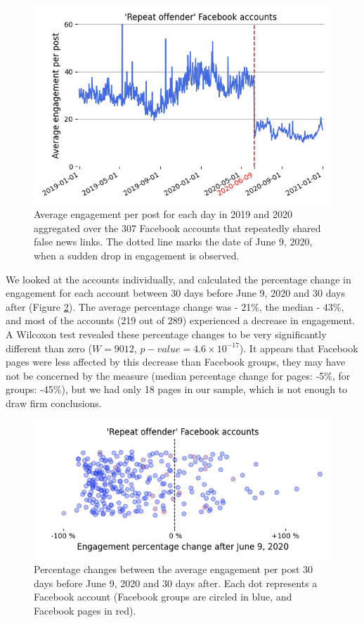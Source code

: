 \documentclass[11pt,a4paper]{article}
\begin{document}
\begin{figure}[!h]
\centering
\includegraphics[width=\linewidth]{./../figure/repeat_average_timeseries.png}
\caption{Average engagement per post for each day in 2019 and 2020 aggregated over the 307 Facebook accounts that repeatedly shared false news links. The dotted line marks the date of June 9, 2020, when a sudden drop in engagement is observed.}
\label{repeat_average_timeseries}
\end{figure}

We looked at the accounts individually, and calculated the percentage change in engagement for each account between 30 days before June 9, 2020 and 30 days after (Figure \ref{repeat_june_drop_percentage_change}). 
The average percentage change was - 21\%, the median - 43\%, and most of the accounts (219 out of 289) experienced a decrease in engagement.
A Wilcoxon test revealed these percentage changes to be very significantly different than zero ($W = 9012$, $p-value = 4.6 \times 10^{-17}$).
It appears that Facebook pages were less affected by this decrease than Facebook groups, they may have not be concerned by the measure (median percentage change for pages: -5\%, for groups: -45\%), but we had only 18 pages in our sample, which is not enough to draw firm conclusions.

\begin{figure}[!h]
\centering
\includegraphics[width=\linewidth]{./../figure/repeat_june_drop_percentage_change.png}
\caption{Percentage changes between the average engagement per post 30 days before June 9, 2020 and 30 days after. Each dot represents a Facebook account (Facebook groups are circled in blue, and Facebook pages in red).}
\label{repeat_june_drop_percentage_change}
\end{figure}
\end{document}
